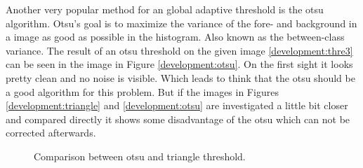 Another very popular method for an global adaptive threshold is the otsu algorithm. Otsu's goal is to maximize the variance of the fore- and background in a image as good as possible in the histogram. Also known as the between-class variance. The result of an otsu threshold on the given image \ref{development:thre3} can be seen in the image in Figure \ref{development:otsu}. On the first sight it looks pretty clean and no noise is visible. Which leads to think that the otsu should be a good algorithm for this problem. But if the images in Figures \ref{development:triangle} and \ref{development:otsu} are investigated a little bit closer and compared directly it shows some disadvantage of the otsu which can not be corrected afterwards.
\begin{figure}[ht]
	\centering
	\caption{Comparison between otsu and triangle threshold.\label{development:diff}}	
\end{figure}
